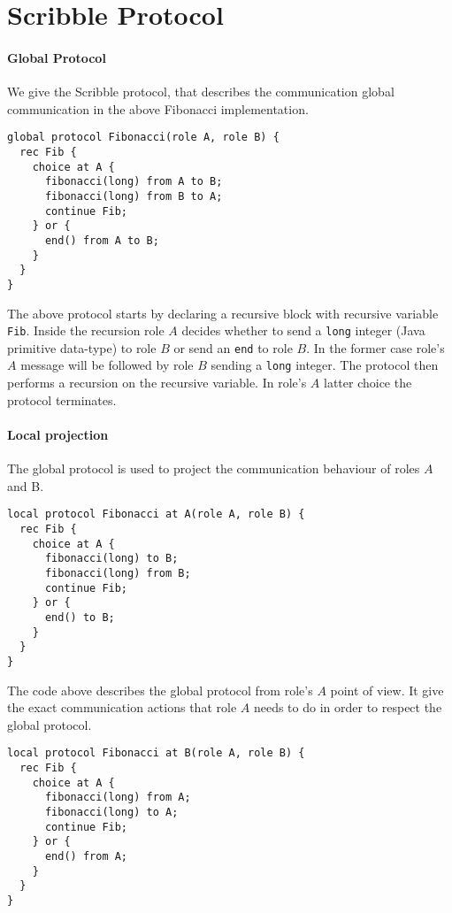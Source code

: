 \section{Scribble Protocol}

\paragraph{Global Protocol}
We give the Scribble protocol, that describes the communication
global communication in the above Fibonacci implementation.
%
\begin{lstlisting}[caption={Global Protocol}]
global protocol Fibonacci(role A, role B) {
  rec Fib {
    choice at A {
      fibonacci(long) from A to B;
      fibonacci(long) from B to A;
      continue Fib;
    } or {
      end() from A to B;
    }
  }
}
\end{lstlisting}

The above protocol starts by declaring a recursive block
with recursive variable \lstinline|Fib|.
Inside the recursion role $A$ decides whether to send
a \lstinline|long| integer (Java primitive data-type)
to role $B$ or send an \lstinline|end| to role $B$.
In the former case role's $A$ message will be followed
by role $B$ sending a \lstinline|long| integer. The protocol
then performs a recursion on the recursive variable.
In role's $A$ latter choice the protocol terminates.

\paragraph{Local projection}
The global protocol is used to project the communication
behaviour of roles $A$ and B.

\begin{lstlisting}[caption={Local Protocol for Role A}]
local protocol Fibonacci at A(role A, role B) {
  rec Fib {
    choice at A {
      fibonacci(long) to B;
      fibonacci(long) from B;
      continue Fib;
    } or {
      end() to B;
    }
  }
}
\end{lstlisting}

The code above describes the global protocol from role's $A$
point of view. It give the exact communication actions that
role $A$ needs to do in order to respect the global protocol.

\begin{lstlisting}[caption={Local Protocol for Role B}]
local protocol Fibonacci at B(role A, role B) {
  rec Fib {
    choice at A {
      fibonacci(long) from A;
      fibonacci(long) to A;
      continue Fib;
    } or {
      end() from A;
    }
  }
}
\end{lstlisting}

